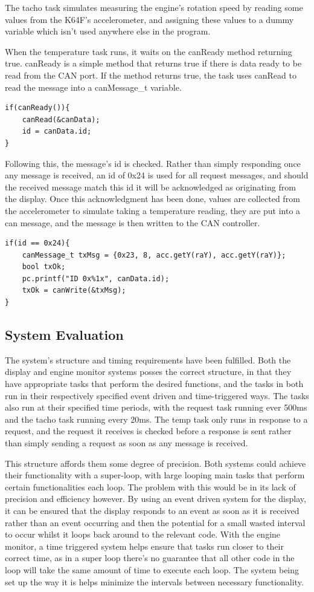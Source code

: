 \documentclass[]{report}
\begin{document}
			The tacho task simulates measuring the engine's rotation speed by reading some values from the K64F's accelerometer, and assigning these values to a dummy variable which isn't used anywhere else in the program.
			
			When the temperature task runs, it waits on the canReady method returning true. canReady is a simple method that returns true if there is data ready to be read from the CAN port. If the method returns true, the task uses canRead to read the message into a canMessage\_t variable.
\begin{lstlisting}
if(canReady()){
	canRead(&canData);
	id = canData.id;
}
\end{lstlisting}

			Following this, the message's id is checked. Rather than simply responding once any message is received, an id of 0x24 is used for all request messages, and should the received message match this id it will be acknowledged as originating from the display. Once this acknowledgment has been done, values are collected from the accelerometer to simulate taking a temperature reading, they are put into a can message, and the message is then written to the CAN controller.	
\begin{lstlisting}
if(id == 0x24){
	canMessage_t txMsg = {0x23, 8, acc.getY(raY), acc.getY(raY)};
	bool txOk;
	pc.printf("ID 0x%1x", canData.id);
	txOk = canWrite(&txMsg);
}
\end{lstlisting} 

		\subsection{System Evaluation}
		The system's structure and timing requirements have been fulfilled. Both the display and engine monitor systems posses the correct structure, in that they have appropriate tasks that perform the desired functions, and the tasks in both run in their respectively specified event driven and time-triggered ways. The tasks also run at their specified time periods, with the request task running ever 500ms and the tacho task running every 20ms. The temp task only runs in response to a request, and the request it receives is checked before a response is sent rather than simply sending a request as soon as any message is received.
		
		This structure affords them some degree of precision. Both systems could achieve their functionality with a super-loop, with large looping main tasks that perform certain functionalities each loop. The problem with this would be in its lack of precision and efficiency however. By using an event driven system for the display, it can be ensured that the display responds to an event as soon as it is received rather than an event occurring and then the potential for a small wasted interval to occur whilst it loops back around to the relevant code. With the engine monitor, a time triggered system helps ensure that tasks run closer to their correct time, as in a super loop there's no guarantee that all other code in the loop will take the same amount of time to execute each loop. The system being set up the way it is helps minimize the intervals between necessary functionality.
		
\end{document}
